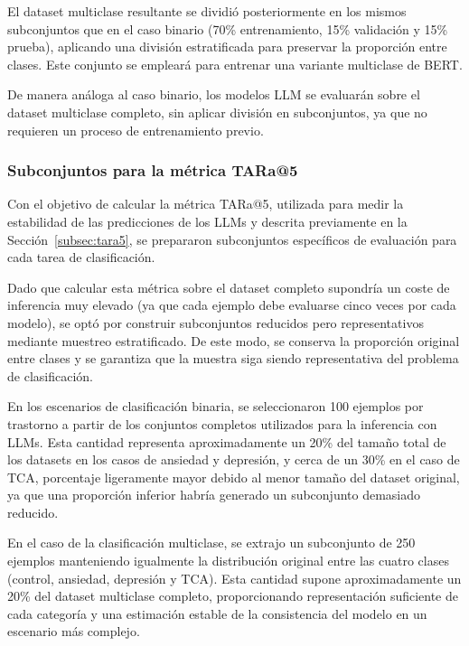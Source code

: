 El dataset multiclase resultante se dividió posteriormente en los mismos subconjuntos que en el caso binario (70\% entrenamiento, 15\% validación y 15\% prueba), aplicando una división estratificada para preservar la proporción entre clases. Este conjunto se empleará para entrenar una variante multiclase de \ac{BERT}.

De manera análoga al caso binario, los modelos LLM se evaluarán sobre el dataset multiclase completo, sin aplicar división en subconjuntos, ya que no requieren un proceso de entrenamiento previo.

\subsubsection{Subconjuntos para la métrica TARa@5}

Con el objetivo de calcular la métrica \ac{TARa@5}, utilizada para medir la estabilidad de las predicciones de los \acp{LLM} y descrita previamente en la Sección~\ref{subsec:tara5}, se prepararon subconjuntos específicos de evaluación para cada tarea de clasificación.

Dado que calcular esta métrica sobre el dataset completo supondría un coste de inferencia muy elevado (ya que cada ejemplo debe evaluarse cinco veces por cada modelo), se optó por construir subconjuntos reducidos pero representativos mediante muestreo estratificado. De este modo, se conserva la proporción original entre clases y se garantiza que la muestra siga siendo representativa del problema de clasificación.

En los escenarios de clasificación binaria, se seleccionaron 100 ejemplos por trastorno a partir de los conjuntos completos utilizados para la inferencia con \acp{LLM}. Esta cantidad representa aproximadamente un 20\% del tamaño total de los datasets en los casos de ansiedad y depresión, y cerca de un 30\% en el caso de \ac{TCA}, porcentaje ligeramente mayor debido al menor tamaño del dataset original, ya que una proporción inferior habría generado un subconjunto demasiado reducido.

En el caso de la clasificación multiclase, se extrajo un subconjunto de 250 ejemplos manteniendo igualmente la distribución original entre las cuatro clases (control, ansiedad, depresión y \ac{TCA}). Esta cantidad supone aproximadamente un 20\% del dataset multiclase completo, proporcionando representación suficiente de cada categoría y una estimación estable de la consistencia del modelo en un escenario más complejo.

